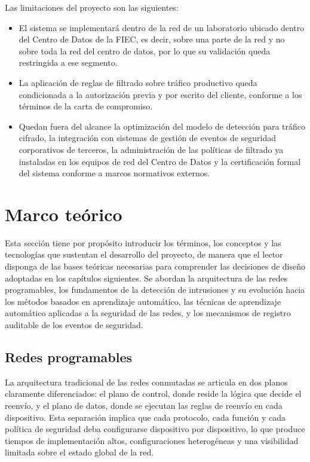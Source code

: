 Las limitaciones del proyecto son las siguientes:

\begin{itemize}
    \item El sistema se implementar\'a dentro de la red de un laboratorio ubicado dentro del Centro de Datos de la FIEC, es decir, sobre una parte de la red y no sobre toda la red del centro de datos, por lo que su validaci\'on queda restringida a ese segmento.
    \item La aplicaci\'on de reglas de filtrado sobre tr\'afico productivo queda condicionada a la autorizaci\'on previa y por escrito del cliente, conforme a los t\'erminos de la carta de compromiso.
    \item Quedan fuera del alcance la optimizaci\'on del modelo de detecci\'on para tr\'afico cifrado, la integraci\'on con sistemas de gesti\'on de eventos de seguridad corporativos de terceros, la administraci\'on de las pol\'iticas de filtrado ya instaladas en los equipos de red del Centro de Datos y la certificaci\'on formal del sistema conforme a marcos normativos externos.
\end{itemize}

\section{Marco te\'orico}

Esta secci\'on tiene por prop\'osito introducir los t\'erminos, los conceptos y las tecnolog\'ias que sustentan el desarrollo del proyecto, de manera que el lector disponga de las bases te\'oricas necesarias para comprender las decisiones de dise\~no adoptadas en los cap\'itulos siguientes. Se abordan la arquitectura de las redes programables, los fundamentos de la detecci\'on de intrusiones y su evoluci\'on hacia los m\'etodos basados en aprendizaje autom\'atico, las t\'ecnicas de aprendizaje autom\'atico aplicadas a la seguridad de las redes, y los mecanismos de registro auditable de los eventos de seguridad.

\subsection{Redes programables}

La arquitectura tradicional de las redes conmutadas se articula en dos planos claramente diferenciados: el plano de control, donde reside la l\'ogica que decide el reenv\'io, y el plano de datos, donde se ejecutan las reglas de reenv\'io en cada dispositivo. Esta separaci\'on implica que cada protocolo, cada funci\'on y cada pol\'itica de seguridad deba configurarse dispositivo por dispositivo, lo que produce tiempos de implementaci\'on altos, configuraciones heterog\'eneas y una visibilidad limitada sobre el estado global de la red.


